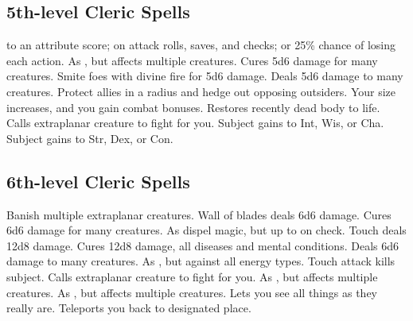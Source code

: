 \subsection{5th-level Cleric Spells}
\begin{spelllist}
    to an attribute score;  on attack rolls, saves, and checks; or 25\% chance of losing each action.
   As , but affects multiple creatures.
   Cures 5d6 damage for many creatures.
   Smite foes with divine fire for 5d6 damage.
   Deals 5d6 damage to many creatures.
   Protect allies in a \areamed radius and hedge out opposing outsiders.
   Your size increases, and you gain combat bonuses.
   Restores recently dead body to life.
   Calls extraplanar creature to fight for you.
   Subject gains  to Int, Wis, or Cha.
   Subject gains  to Str, Dex, or Con.
\end{spelllist}

\subsection{6th-level Cleric Spells}
\begin{spelllist}
   Banish multiple extraplanar creatures. 
   Wall of blades deals 6d6 damage.
   Cures 6d6 damage for many creatures.
   As dispel magic, but up to  on check.
   Touch deals 12d8 damage.
   Cures 12d8 damage, all diseases and mental conditions.
   Deals 6d6 damage to many creatures.
   As , but against all energy types.
   Touch attack kills subject.
   Calls extraplanar creature to fight for you.
   As , but affects multiple creatures.
   As , but affects multiple creatures.
  \M Lets you see all things as they really are.
   Teleports you back to designated place.
\end{spelllist}

